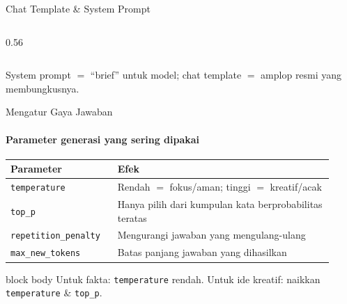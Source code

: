 \documentclass[aspectratio=169,t]{beamer}
\begin{document}
\begin{frame}{Chat Template \& System Prompt}
\begin{columns}[T]
\begin{column}{0.56\textwidth}
{%
      }
    \end{column}
  \end{columns}
  \vspace{0.2em}
  \begin{center}
    \textcolor{nvlightgreen}{\small System prompt $=$ ``brief'' untuk model; chat template $=$ amplop resmi yang membungkusnya.}
  \end{center}
\end{frame}

\begin{frame}{Mengatur Gaya Jawaban}
  \framesubtitle{Parameter generasi yang sering dipakai}
  \begin{center}
  \renewcommand{\arraystretch}{1.3}
  {\footnotesize
  \setlength{\tabcolsep}{6pt}
  \begin{tabular}{@{}p{0.30\linewidth}p{0.62\linewidth}@{}}
    \toprule
    \rowcolor{nvcard!50}
    \textbf{Parameter} & \textbf{Efek} \\
    \midrule
    \texttt{temperature} & Rendah $=$ fokus/aman; tinggi $=$ kreatif/acak \\
    \texttt{top\_p} & Hanya pilih dari kumpulan kata berprobabilitas teratas \\
    \texttt{repetition\_penalty} & Mengurangi jawaban yang mengulang-ulang \\
    \texttt{max\_new\_tokens} & Batas panjang jawaban yang dihasilkan \\
    \bottomrule
  \end{tabular}%
  }
  \end{center}
  \vspace{0.5em}
  \begin{beamercolorbox}[rounded=true,shadow=false,sep=6pt]{block body}
    \centering\small\color{nvlightgreen}
    Untuk fakta: \texttt{temperature} rendah. Untuk ide kreatif: naikkan \texttt{temperature} \& \texttt{top\_p}.
  \end{beamercolorbox}
\end{frame}
\end{document}
